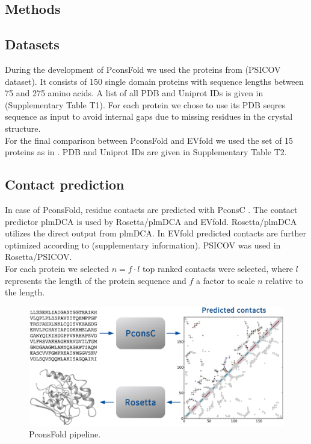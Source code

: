 \documentclass{bioinfo}
\begin{document}
\begin{methods}
\section{Methods}
\subsection{Datasets}
During the development of PconsFold we used the proteins from \citeauthor{jones_PSICOV:_2012} \citeyear{jones_PSICOV:_2012} (PSICOV dataset). It consists of 150 single domain proteins with sequence lengths between 75 and 275 amino acids. A list of all PDB and Uniprot IDs is given in (Supplementary Table T1). For each protein we chose to use its PDB seqres sequence as input to avoid internal gaps due to missing residues in the crystal structure. \\\indent
For the final comparison between PconsFold and EVfold we used the set of 15 proteins as in \citeauthor{marks_protein_2011} \citeyear{marks_protein_2011} . PDB and Uniprot IDs are given in Supplementary Table T2.
\subsection{Contact prediction}
In case of PconsFold, residue contacts are predicted with PconsC \cite[]{skwark_pconsc:_2013}. The contact predictor plmDCA \cite[]{ekeberg_improved_2013} is used by Rosetta/plmDCA and EVfold. Rosetta/plmDCA utilizes the direct output from plmDCA. In EVfold predicted contacts are further optimized according to \citeauthor{marks_protein_2011} \citeyear{marks_protein_2011} (supplementary information). PSICOV was used in Rosetta/PSICOV. \\\indent  
For each protein we selected $n = f \cdot l$ top ranked contacts were selected, where $l$ represents the length of the protein sequence and $f$ a factor to scale $n$ relative to the length.
\begin{figure}[!tpb]%
    \centerline{\includegraphics[scale=0.35]{figures/pipeline.eps}}
\caption{PconsFold pipeline.}\label{fig:main}
\end{figure}

\end{methods}
\end{document}
